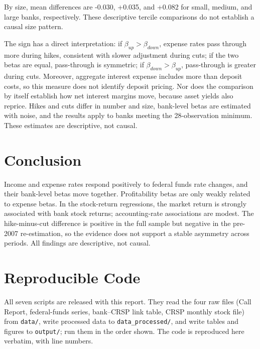 \documentclass[11pt]{article}
\begin{document}
By size, mean differences are -0.030, +0.035, and +0.082 for small, medium, and large banks, respectively. These descriptive tercile comparisons do not establish a causal size pattern.

The sign has a direct interpretation: if $\beta_{up}>\beta_{down}$, expense rates pass through more during hikes, consistent with slower adjustment during cuts; if the two betas are equal, pass-through is symmetric; if $\beta_{down}>\beta_{up}$, pass-through is greater during cuts. Moreover, aggregate interest expense includes more than deposit costs, so this measure does not identify deposit pricing. Nor does the comparison by itself establish how net interest margins move, because asset yields also reprice. Hikes and cuts differ in number and size, bank-level betas are estimated with noise, and the results apply to banks meeting the 28-observation minimum. These estimates are descriptive, not causal.

\section{Conclusion}
Income and expense rates respond positively to federal funds rate changes,
and their bank-level betas move together. Profitability betas are only weakly
related to expense betas. In the stock-return regressions, the market return
is strongly associated with bank stock returns; accounting-rate associations
are modest. The hike-minus-cut difference is positive in the full sample
but negative in the pre-2007 re-estimation, so the evidence does not support a
stable asymmetry across periods. All findings are descriptive, not causal.

\clearpage
\appendix
\section{Reproducible Code}
All seven scripts are released with this report. They read the four raw files
(Call Report, federal-funds series, bank--CRSP link table, CRSP monthly stock
file) from \texttt{data/}, write processed data to \texttt{data\_processed/},
and write tables and figures to \texttt{output/}; run them in the order shown.
The code is reproduced here verbatim, with line numbers.
\end{document}
